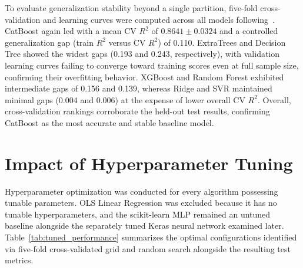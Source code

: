 To evaluate generalization stability beyond a single partition, five-fold cross-validation and learning curves were computed across all models following~\cite{atique2026explainable}. CatBoost again led with a mean CV \(R^2\) of \(0.8641 \pm 0.0324\) and a controlled generalization gap (train \(R^2\) versus CV \(R^2\)) of 0.110. ExtraTrees and Decision Tree showed the widest gaps (0.193 and 0.243, respectively), with validation learning curves failing to converge toward training scores even at full sample size, confirming their overfitting behavior. XGBoost and Random Forest exhibited intermediate gaps of 0.156 and 0.139, whereas Ridge and SVR maintained minimal gaps (0.004 and 0.006) at the expense of lower overall CV \(R^2\). Overall, cross-validation rankings corroborate the held-out test results, confirming CatBoost as the most accurate and stable baseline model.


\section{Impact of Hyperparameter Tuning}

Hyperparameter optimization was conducted for every algorithm possessing tunable parameters. OLS Linear Regression was excluded because it has no tunable hyperparameters, and the scikit-learn MLP remained an untuned baseline alongside the separately tuned Keras neural network examined later. Table~\ref{tab:tuned_performance}\cite{atique2026explainable} summarizes the optimal configurations identified via five-fold cross-validated grid and random search alongside the resulting test metrics.

